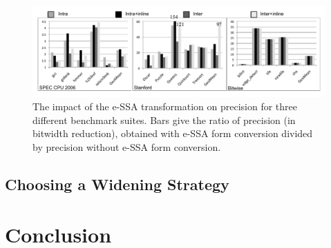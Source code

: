 \documentclass{paper}
\begin{document}
\begin{figure}[t!]
\begin{center}
\includegraphics[width=1\textwidth]{images/precESSA}
\end{center}
\caption{\label{fig:precESSA}
The impact of the e-SSA transformation on precision for three different
benchmark suites. Bars give the ratio of precision (in bitwidth reduction),
obtained with e-SSA form conversion divided by precision without e-SSA form
conversion.}
\end{figure}

\subsection{Choosing a Widening Strategy}
\label{sub:widen}

\section{Conclusion}
\label{sec:con}



\end{document}

